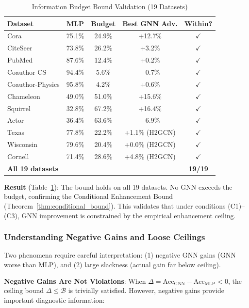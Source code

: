 \begin{table}[t]
\centering
\caption{Information Budget Bound Validation (19 Datasets)}
\label{tab:budget_bound_all}
\small
\begin{tabular}{@{}lcccc@{}}
\toprule
\textbf{Dataset} & \textbf{MLP} & \textbf{Budget} & \textbf{Best GNN Adv.} & \textbf{Within?} \\
\midrule
Cora & 75.1\% & 24.9\% & +12.7\% & $\checkmark$ \\
CiteSeer & 73.8\% & 26.2\% & +3.2\% & $\checkmark$ \\
PubMed & 87.6\% & 12.4\% & +0.2\% & $\checkmark$ \\
Coauthor-CS & 94.4\% & 5.6\% & $-0.7\%$ & $\checkmark$ \\
Coauthor-Physics & 95.8\% & 4.2\% & +0.6\% & $\checkmark$ \\
\midrule
Chameleon & 49.0\% & 51.0\% & +15.6\% & $\checkmark$ \\
Squirrel & 32.8\% & 67.2\% & +16.4\% & $\checkmark$ \\
Actor & 36.4\% & 63.6\% & $-6.9\%$ & $\checkmark$ \\
\midrule
Texas & 77.8\% & 22.2\% & +1.1\% (H2GCN) & $\checkmark$ \\
Wisconsin & 79.6\% & 20.4\% & +0.0\% (H2GCN) & $\checkmark$ \\
Cornell & 71.4\% & 28.6\% & +4.8\% (H2GCN) & $\checkmark$ \\
\midrule
\textbf{All 19 datasets} & & & & \textbf{19/19} \\
\bottomrule
\end{tabular}
\end{table}

\textbf{Result} (Table~\ref{tab:budget_bound_all}): The bound holds on all 19 datasets. No GNN exceeds the budget, confirming the Conditional Enhancement Bound (Theorem~\ref{thm:conditional_bound}). This validates that under conditions (C1)--(C3), GNN improvement is constrained by the empirical enhancement ceiling.

\subsubsection{Understanding Negative Gains and Loose Ceilings}
\label{sec:negative_gain}

Two phenomena require careful interpretation: (1) negative GNN gains (GNN worse than MLP), and (2) large slackness (actual gain far below ceiling).

\textbf{Negative Gains Are Not Violations}: When $\Delta = \text{Acc}_{\text{GNN}} - \text{Acc}_{\text{MLP}} < 0$, the ceiling bound $\Delta \leq \mathcal{B}$ is trivially satisfied. However, negative gains provide important diagnostic information:

